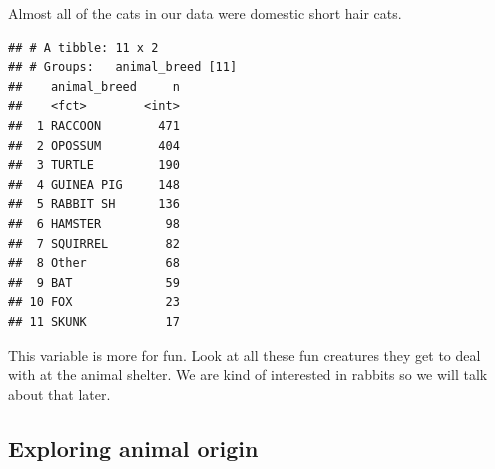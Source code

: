 \documentclass[]{article}
\newenvironment{Shaded}{\begin{snugshade}}{\end{snugshade}}
\newcommand{\KeywordTok}[1]{\textcolor[rgb]{0.13,0.29,0.53}{\textbf{#1}}}
\newcommand{\DataTypeTok}[1]{\textcolor[rgb]{0.13,0.29,0.53}{#1}}
\newcommand{\DecValTok}[1]{\textcolor[rgb]{0.00,0.00,0.81}{#1}}
\newcommand{\StringTok}[1]{\textcolor[rgb]{0.31,0.60,0.02}{#1}}
\newcommand{\OtherTok}[1]{\textcolor[rgb]{0.56,0.35,0.01}{#1}}
\newcommand{\OperatorTok}[1]{\textcolor[rgb]{0.81,0.36,0.00}{\textbf{#1}}}
\newcommand{\NormalTok}[1]{#1}
\begin{document}
Almost all of the cats in our data were domestic short hair cats.

\begin{Shaded}
\end{Shaded}

\begin{verbatim}
## # A tibble: 11 x 2
## # Groups:   animal_breed [11]
##    animal_breed     n
##    <fct>        <int>
##  1 RACCOON        471
##  2 OPOSSUM        404
##  3 TURTLE         190
##  4 GUINEA PIG     148
##  5 RABBIT SH      136
##  6 HAMSTER         98
##  7 SQUIRREL        82
##  8 Other           68
##  9 BAT             59
## 10 FOX             23
## 11 SKUNK           17
\end{verbatim}

This variable is more for fun. Look at all these fun creatures they get
to deal with at the animal shelter. We are kind of interested in rabbits
so we will talk about that later.

\subsection{Exploring animal origin}\label{exploring-animal-origin}

\begin{Shaded}
\end{Shaded}
\end{document}
